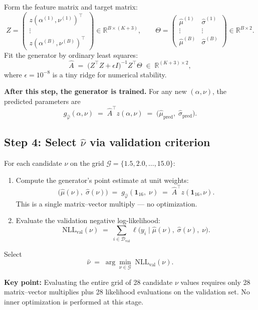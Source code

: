 \documentclass[12pt]{article}
\begin{document}
Form the feature matrix and target matrix:
\[
Z = \begin{pmatrix} z(\alpha^{(1)},\nu^{(1)})^\top \\ \vdots \\ z(\alpha^{(B)},\nu^{(B)})^\top \end{pmatrix} \in \mathbb{R}^{B\times(K+3)}, \qquad
\Theta = \begin{pmatrix} \hat\mu^{(1)} & \hat\sigma^{(1)} \\ \vdots & \vdots \\ \hat\mu^{(B)} & \hat\sigma^{(B)} \end{pmatrix} \in \mathbb{R}^{B\times 2}.
\]
Fit the generator by ordinary least squares:
\[
\hat A \;=\; \bigl(Z^\top Z + \epsilon I\bigr)^{-1} Z^\top \Theta \;\in\;\mathbb{R}^{(K+3)\times 2},
\]
where $\epsilon = 10^{-8}$ is a tiny ridge for numerical stability.

\textbf{After this step, the generator is trained.}  For any new $(\alpha,\nu)$, the predicted parameters are
\[
g_{\hat\varphi}(\alpha,\nu) \;=\; \hat A^\top z(\alpha,\nu) \;=\; \bigl(\hat\mu_{\mathrm{pred}},\;\hat\sigma_{\mathrm{pred}}\bigr).
\]

\subsection{Step 4: Select $\hat\nu$ via validation criterion}

For each candidate $\nu$ on the grid $\mathcal{G} = \{1.5, 2.0, \ldots, 15.0\}$:
\begin{enumerate}
\item Compute the generator's point estimate at unit weights:
\[
\bigl(\hat\mu(\nu),\;\hat\sigma(\nu)\bigr) \;=\; g_{\hat\varphi}(\mathbf{1}_{16},\;\nu) \;=\; \hat A^\top z(\mathbf{1}_{16},\nu).
\]
This is a single matrix--vector multiply --- no optimization.

\item Evaluate the validation negative log-likelihood:
\[
\mathrm{NLL}_{\mathrm{val}}(\nu) \;=\; \sum_{i\in\mathcal{D}_{\mathrm{val}}} \ell\!\bigl(y_i \mid \hat\mu(\nu),\;\hat\sigma(\nu),\;\nu\bigr).
\]
\end{enumerate}
Select
\[
\hat\nu \;=\; \arg\min_{\nu\in\mathcal{G}}\; \mathrm{NLL}_{\mathrm{val}}(\nu).
\]

\textbf{Key point:}  Evaluating the entire grid of 28 candidate $\nu$ values requires only 28 matrix--vector multiplies plus 28 likelihood evaluations on the validation set.  No inner optimization is performed at this stage.
\end{document}
